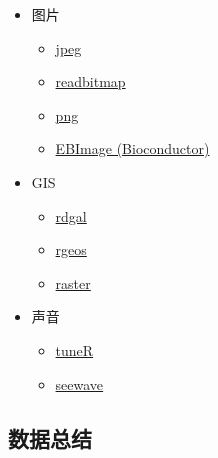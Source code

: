 \documentclass[
]{book}
\providecommand{\tightlist}{%
  \setlength{\itemsep}{0pt}\setlength{\parskip}{0pt}}
\begin{document}
\begin{itemize}
\tightlist
\item
  图片

  \begin{itemize}
  \tightlist
  \item
    \href{http://cran.r-project.org/web/packages/jpeg/index.html}{jpeg}
  \item
    \href{http://cran.r-project.org/web/packages/readbitmap/index.html}{readbitmap}
  \item
    \href{http://cran.r-project.org/web/packages/png/index.html}{png}
  \item
    \href{http://www.bioconductor.org/packages/2.13/bioc/html/EBImage.html}{EBImage (Bioconductor)}
  \end{itemize}
\item
  GIS

  \begin{itemize}
  \tightlist
  \item
    \href{http://cran.r-project.org/web/packages/rgdal/index.html}{rdgal}
  \item
    \href{http://cran.r-project.org/web/packages/rgeos/index.html}{rgeos}
  \item
    \href{http://cran.r-project.org/web/packages/raster/index.html}{raster}
  \end{itemize}
\item
  声音

  \begin{itemize}
  \tightlist
  \item
    \href{http://cran.r-project.org/web/packages/tuneR/}{tuneR}
  \item
    \href{http://rug.mnhn.fr/seewave/}{seewave}
  \end{itemize}
\end{itemize}

\hypertarget{ux6570ux636eux603bux7ed3}{%
\subsection{数据总结}\label{ux6570ux636eux603bux7ed3}}
\end{document}
